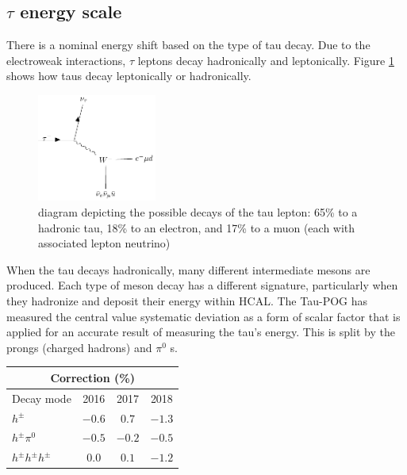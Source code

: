 \subsection{$\tau$ energy scale}
There is a nominal energy shift based on the type of tau decay. Due to the electroweak interactions, $\tau$ leptons decay hadronically and leptonically. Figure \ref{fig:taudecay} shows how taus decay leptonically or hadronically.

\begin{figure}[ht!b]
\begin{center}
  \includegraphics[width=0.35\textwidth]{"Figures/taudecay.pdf"}
    \caption{\label{fig:taudecay} diagram depicting the possible decays of the tau lepton: 65\% to a hadronic tau, 18\% to an electron, and 17\% to a muon (each with associated lepton neutrino)}
\end{center}
\end{figure} 
When the tau decays hadronically, many different intermediate mesons are produced. Each type of meson decay has a different signature, particularly when they hadronize and deposit their energy within HCAL. The Tau-POG has measured the central value systematic deviation as a form of scalar factor that is applied for an accurate result of measuring the tau's energy. This is split by the prongs (charged hadrons) and $\pi^0$ s.  

\begin{table}[h]
  \begin{center}
    \label{tab:TES}
    \begin{tabular} { l | c  c  c }
      \hline \multicolumn{4}{c}{Correction (\%)} \\
      \hline Decay mode & 2016 & 2017 & 2018 \\ \hline
      $h^{\pm}$ & $-0.6$ & $0.7$ & $-1.3$  \\ 
      $h^{\pm}\pi^{0}$ & $-0.5$ & $-0.2$ & $-0.5$  \\ 
      $h^{\pm}h^{\pm}h^{\pm}$ & $0.0$ & $0.1$ & $-1.2$ \\ 
    \end{tabular}
  \end{center}
\end{table}

